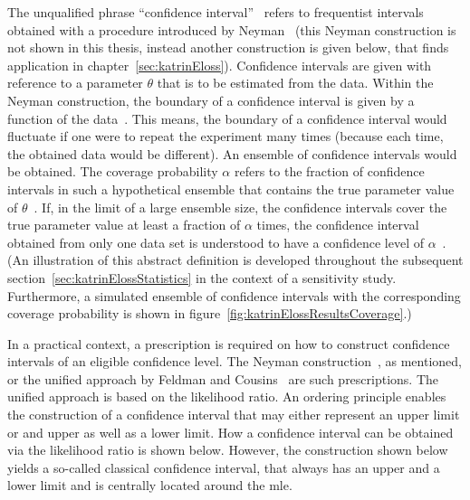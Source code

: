 The unqualified phrase ``confidence interval''~\cite{ReviewOfParticlePhysics} refers to frequentist intervals obtained with a procedure introduced by Neyman~\cite{Neyman1937} (this Neyman construction is not shown in this thesis, instead another construction is given below, that finds application in chapter~\ref{sec:katrinEloss}). Confidence intervals are given with reference to a parameter $\theta$ that is to be estimated from the data. Within the Neyman construction, the boundary of a confidence interval is given by a function of the data~\cite{ReviewOfParticlePhysics}. This means, the boundary of a confidence interval would fluctuate if one were to repeat the experiment many times (because each time, the obtained data would be different). An ensemble of confidence intervals would be obtained. The coverage probability $\alpha$ refers to the fraction of confidence intervals in such a hypothetical ensemble that contains the true parameter value of $\theta$~\cite{ReviewOfParticlePhysics}. If, in the limit of a large ensemble size, the confidence intervals cover the true parameter value at least a fraction of $\alpha$ times, the confidence interval obtained from only one data set is understood to have a confidence level of $\alpha$~\cite{ReviewOfParticlePhysics}. (An illustration of this abstract definition is developed throughout the subsequent section~\ref{sec:katrinElossStatistics} in the context of a sensitivity study. Furthermore, a simulated ensemble of confidence intervals with the corresponding coverage probability is shown in figure~\ref{fig:katrinElossResultsCoverage}.)

In a practical context, a prescription is required on how to construct confidence intervals of an eligible confidence level. The Neyman construction~\cite{Neyman1937}, as mentioned, or the unified approach by Feldman and Cousins~\cite{Feldman1998} are such prescriptions. The unified approach is based on the likelihood ratio. An ordering principle enables the construction of a confidence interval that may either represent an upper limit or and upper as well as a lower limit. How a confidence interval can be obtained via the likelihood ratio is shown below. However, the construction shown below yields a so-called classical confidence interval, that always has an upper and a lower limit and is centrally located around the \gls{mle}.  

